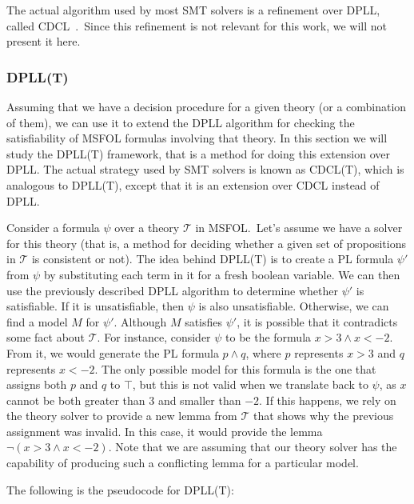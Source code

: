 The actual algorithm used by most SMT solvers is a refinement over DPLL, called CDCL~\cite{cdcl}.\ Since this refinement is not relevant for this work, we will not present it here.

\subsubsection{DPLL(T)}

Assuming that we have a decision procedure for a given theory (or a combination of them), we can use it to extend the DPLL algorithm for checking the satisfiability of MSFOL formulas involving that theory. In this section we will study the DPLL(T) framework, that is a method for doing this extension over DPLL. The actual strategy used by SMT solvers is known as CDCL(T), which is analogous to DPLL(T), except that it is an extension over CDCL instead of DPLL.

Consider a formula $\psi$ over a theory $\mathcal{T}$ in MSFOL.\ Let's assume we have a solver for this theory (that is, a method for deciding whether a given set of propositions in $\mathcal{T}$ is consistent or not). The idea behind DPLL(T) is to create a PL formula $\psi'$ from $\psi$ by substituting each term in it for a fresh boolean variable. We can then use the previously described DPLL algorithm to determine whether $\psi'$ is satisfiable. If it is unsatisfiable, then $\psi$ is also unsatisfiable. Otherwise, we can find a model $M$ for $\psi'$. Although $M$ satisfies $\psi'$, it is possible that it contradicts some fact about $\mathcal{T}$. For instance, consider $\psi$ to be the formula $x > 3 \wedge x < -2$. From it, we would generate the PL formula $p \wedge q$, where $p$ represents $x > 3$ and $q$ represents $x < -2$. The only possible model for this formula is the one that assigns both $p$ and $q$ to $\top$, but this is not valid when we translate back to $\psi$, as $x$ cannot be both greater than $3$ and smaller than $-2$. If this happens, we rely on the theory solver to provide a new lemma from $\mathcal{T}$ that shows why the previous assignment was invalid. In this case, it would provide the lemma $\neg (x > 3 \wedge x < -2)$. Note that we are assuming that our theory solver has the capability of producing such a conflicting lemma for a particular model.

The following is the pseudocode for DPLL(T):

